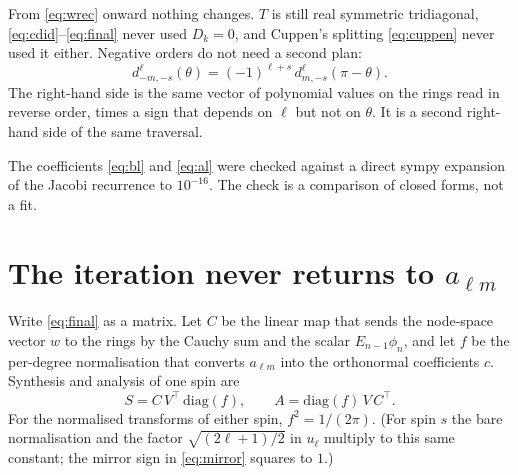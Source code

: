 \documentclass[11pt,a4paper]{article}
\numberwithin{equation}{section}
\begin{document}
From \eqref{eq:wrec} onward nothing changes. $T$ is still real symmetric tridiagonal,
\eqref{eq:cdid}--\eqref{eq:final} never used $D_k=0$, and Cuppen's splitting
\eqref{eq:cuppen} never used it either. Negative orders do not need a second plan:
\begin{equation}
  d^\ell_{-m,-s}(\theta) = (-1)^{\ell+s}\, d^\ell_{m,-s}(\pi-\theta).
  \label{eq:mirror}
\end{equation}
The right-hand side is the same vector of polynomial values on the rings read in reverse
order, times a sign that depends on $\ell$ but not on $\theta$. It is a second right-hand
side of the same traversal.

The coefficients \eqref{eq:bl} and \eqref{eq:al} were checked against a direct sympy
expansion of the Jacobi recurrence to $10^{-16}$. The check is a comparison of closed
forms, not a fit.

\section{The iteration never returns to \texorpdfstring{$a_{\ell m}$}{alm}}
\label{sec:node}

Write \eqref{eq:final} as a matrix. Let $C$ be the linear map that sends the node-space
vector $w$ to the rings by the Cauchy sum and the scalar $E_{n-1}\phi_n$, and let $f$ be
the per-degree normalisation that converts $a_{\ell m}$ into the orthonormal coefficients
$c$. Synthesis and analysis of one spin are
\begin{equation}
  S = C\, V^\top \,\mathrm{diag}(f),
  \qquad
  A = \mathrm{diag}(f)\, V\, C^\top.
  \label{eq:SA}
\end{equation}
For the normalised transforms of either spin, $f^2=1/(2\pi)$. (For spin $s$ the bare
normalisation and the factor $\sqrt{(2\ell+1)/2}$ in $u_\ell$ multiply to this same
constant; the mirror sign in \eqref{eq:mirror} squares to $1$.)
\end{document}

